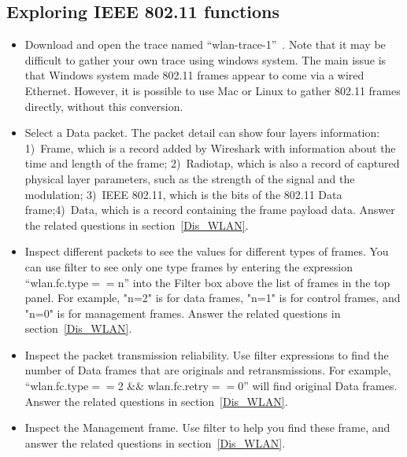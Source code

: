
\subsection{Exploring IEEE 802.11 functions}\label{Pro_WLAN}
\begin{itemize}

\item Download and open the trace named ``wlan-trace-1''~\cite{Tanenbaum10}. Note that it may be difficult to gather your own trace using windows system. The main issue is that Windows system made 802.11 frames appear to come via a wired Ethernet. However, it is possible to use Mac or Linux to gather 802.11 frames directly, without this conversion.

\item Select a Data packet. The packet detail can show four layers information: 1)~Frame, which is a record added by Wireshark with information about the time and length of the frame; 2)~Radiotap, which is also a record of captured physical layer parameters, such as the strength of the signal and the modulation; 3)~IEEE 802.11, which is the bits of the 802.11 Data frame;4)~Data, which is a record containing the frame payload data. Answer the related questions in section~\ref{Dis_WLAN}. 

\item Inspect different packets to see the values for different types of frames. You can use filter to see only one type frames by entering the expression “wlan.fc.type$==$n” into the Filter box above the list of frames in the top panel. For example, "n=2" is for data frames, "n=1" is for control frames, and "n=0" is for management frames. Answer the related questions in section~\ref{Dis_WLAN}. 

\item Inspect the packet transmission reliability. Use filter expressions to find the number of Data frames that are originals and retransmissions. For example, “wlan.fc.type$==$2 $\&\&$ wlan.fc.retry$==$0” will find original Data frames. Answer the related questions in section~\ref{Dis_WLAN}. 

\item Inspect the Management frame. Use filter to help you find these frame, and answer the related questions in section~\ref{Dis_WLAN}. 
\end{itemize}

